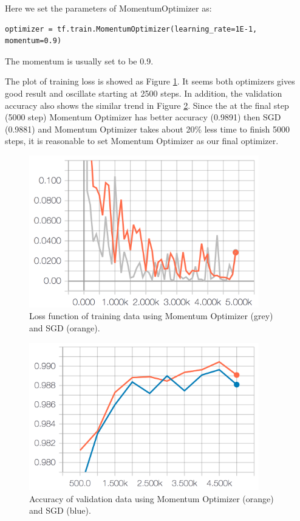 \documentclass[11pt]{article}
\begin{document}
Here we set the parameters of MomentumOptimizer as: 

\begin{lstlisting}
optimizer = tf.train.MomentumOptimizer(learning_rate=1E-1, momentum=0.9)
\end{lstlisting}

The momentum is usually set to be 0.9.

The plot of training loss is showed as Figure \ref{fig:momentum-loss}. It seems both optimizers gives good result and oscillate starting at 2500 steps. In addition, the validation accuracy also shows the similar trend in Figure \ref{fig:momentum-accuracy}. Since the at the final step (5000 step) Momentum Optimizer has better accuracy (0.9891) then SGD (0.9881) and  Momentum Optimizer takes about 20\% less time to finish 5000 steps, it is reasonable to set Momentum Optimizer as our final optimizer.

\begin{figure}[!htb]
   \centering
   \includegraphics[width=10cm]{images/optimizer-loss.png} %
   \caption{Loss function of training data using Momentum Optimizer (grey) and SGD (orange).}
   \label{fig:momentum-loss}
\end{figure}


\begin{figure}[!htb]
   \centering
   \includegraphics[width=10cm]{images/optimizer-accuracy.png} %
   \caption{Accuracy of validation data using Momentum Optimizer (orange) and SGD (blue).}
   \label{fig:momentum-accuracy}
\end{figure}
\end{document}

